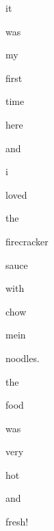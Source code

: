\documentclass[varwidth]{standalone}
\begin{document}
 \begin{CJK*}{UTF8}{gbsn} 
{\setlength{\fboxsep}{0pt}\colorbox{white!0}{\parbox{0.9\textwidth}{
\colorbox{red!100.0}{\strut it} 
\colorbox{red!93.34789276123047}{\strut was} 
\colorbox{red!94.4807357788086}{\strut my} 
\colorbox{red!88.08442687988281}{\strut first} 
\colorbox{red!55.02796936035156}{\strut time} 
\colorbox{red!48.76464080810547}{\strut here} 
\colorbox{red!30.40724754333496}{\strut and} 
\colorbox{red!74.82772827148438}{\strut i} 
\colorbox{red!28.02102279663086}{\strut loved} 
\colorbox{red!55.178321838378906}{\strut the} 
\colorbox{red!19.45111846923828}{\strut firecracker} 
\colorbox{red!23.765459060668945}{\strut sauce} 
\colorbox{red!16.883424758911133}{\strut with} 
\colorbox{red!12.600982666015625}{\strut chow} 
\colorbox{red!18.928810119628906}{\strut mein} 
\colorbox{red!21.568185806274414}{\strut noodles.} 
\colorbox{red!52.64145278930664}{\strut the} 
\colorbox{red!21.623056411743164}{\strut food} 
\colorbox{red!51.01632308959961}{\strut was} 
\colorbox{red!18.758102416992188}{\strut very} 
\colorbox{red!25.791894912719727}{\strut hot} 
\colorbox{red!0.0}{\strut and} 
\colorbox{red!10.6640625}{\strut fresh!} 

}}}\end{CJK*}
\end{document}
